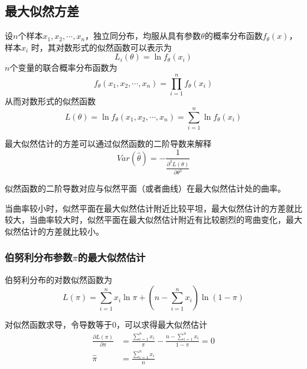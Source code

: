 \subsection{最大似然方差}

设$n$个样本$x_1,x_2,\cdots,x_n$，独立同分布，均服从具有参数$\theta$的概率分布函数$f_\theta(x)$，样本$x_i$ 时，其对数形式的似然函数可以表示为
\begin{equation}
    L_i(\theta) = \ln f_\theta(x_i)
\end{equation}
$n$个变量的联合概率分布函数为
\begin{equation}
    f_\theta(x_1,x_2,\cdots,x_n) = \prod_{i=1}^n f_\theta(x_i)
\end{equation}
从而对数形式的似然函数
\begin{equation}
    L(\theta) = \ln f_\theta(x_1,x_2,\cdots,x_n) = \sum_{i=1}^n \ln f_\theta(x_i)
\end{equation}


最大似然估计的方差可以通过似然函数的二阶导数来解释
\begin{equation}
    Var(\hat{\theta}) = -\frac{1}{\frac{\partial^2  L(\theta)}{\partial \theta^2}}
\end{equation}

似然函数的二阶导数对应与似然平面（或者曲线）在最大似然估计处的曲率。

\begin{note}
    当曲率较小时，似然平面在最大似然估计附近比较平坦，最大似然估计的方差就比较大，当曲率较大时，似然平面在最大似然估计附近有比较剧烈的弯曲变化，最大似然估计的方差就比较小。
\end{note}

\subsubsection{伯努利分布参数$\pi$的最大似然估计}

伯努利分布的对数似然函数为
\begin{equation}
    L(\pi) = \sum_{i=1}^n x_i \ln \pi + (n-\sum_{i=1}^n x_i)\ln(1-\pi)
\end{equation}

对似然函数求导，令导数等于0，可以求得最大似然估计
\begin{equation}
    \begin{aligned}
        \frac{\partial L(\pi)}{\partial \pi} & = \frac{\sum\limits_{i=1}^n x_i}{\pi} - \frac{n-\sum_{i=1}^n x_i}{1-\pi} = 0 \\
        \hat{\pi }                           & = \frac{\sum\limits_{i=1}^n x_i}{n}
    \end{aligned}
\end{equation}

